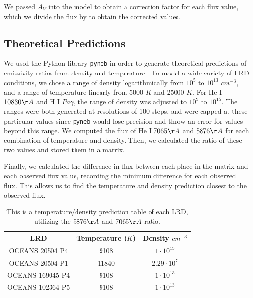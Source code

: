 \documentclass[letterpaper]{aastex701}
\begin{document}
We passed $A_V$ into the model to obtain a correction factor for each flux value, which we divide the flux by to obtain the corrected values.

\subsection{Theoretical Predictions}

We used the Python library \texttt{pyneb} in order to generate theoretical predictions of emissivity ratios from density and temperature \citep{2015A&A...573A..42L}. To model a wide variety of LRD conditions, we chose a range of density logarithmically from $10^{5}$ to $10^{13}$ $cm^{-3}$, and a range of temperature linearly from 5000 $K$ and 25000 $K$. For He I $10830\AA$ and H I $Pa\gamma$, the range of density was adjusted to $10^{9}$ to $10^{15}$. The ranges were both generated at resolutions of 100 steps, and were capped at these particular values since \texttt{pyneb} would lose precision and throw an error for values beyond this range. We computed the flux of He I $7065\AA$ and $5876\AA$ for each combination of temperature and density. Then, we calculated the ratio of these two values and stored them in a matrix.

Finally, we calculated the difference in flux between each place in the matrix and each observed flux value, recording the minimum difference for each observed flux. This allows us to find the temperature and density prediction closest to the observed flux.

\begin{table}[h]
\begin{center}
\caption{This is a temperature/density prediction table of each LRD, utilizing the $5876\AA$ and $7065\AA$ ratio.}
\begin{tabular}{|c|c|c|}
    \hline
    \centering
    \textbf{LRD} & Temperature ($K$) & Density $cm^{-3}$ \\ \hline
    OCEANS 20504 P4 & 9108 & $1 \cdot 10^{13}$ \\ \hline
    OCEANS 20504 P1 & 11840 & $2.29 \cdot 10^{7}$ \\  \hline
    OCEANS 169045 P4 & 9108 & $1 \cdot 10^{13}$ \\   \hline
    OCEANS 102364 P5 & 9108 & $1 \cdot 10^{13}$ \\   \hline
\end{tabular}
\end{center}
\end{table}
\end{document}
